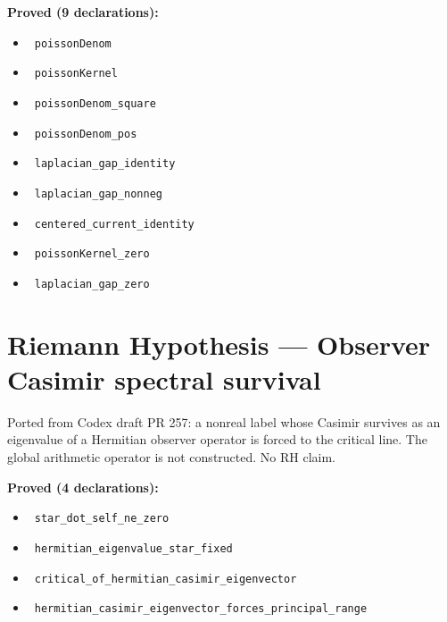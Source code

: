 \documentclass{report}
\theoremstyle{definition}
\begin{document}
\noindent\textbf{Proved (9 declarations):}
\begin{itemize}
  \item {}\leanok\ \texttt{poissonDenom}
  \item {}\leanok\ \texttt{poissonKernel}
  \item {}\leanok\ \texttt{poissonDenom\_square}
  \item {}\leanok\ \texttt{poissonDenom\_pos}
  \item {}\leanok\ \texttt{laplacian\_gap\_identity}
  \item {}\leanok\ \texttt{laplacian\_gap\_nonneg}
  \item {}\leanok\ \texttt{centered\_current\_identity}
  \item {}\leanok\ \texttt{poissonKernel\_zero}
  \item {}\leanok\ \texttt{laplacian\_gap\_zero}
\end{itemize}

\section{Riemann Hypothesis --- Observer Casimir spectral survival}
Ported from Codex draft PR 257: a nonreal label whose Casimir survives as an eigenvalue of a Hermitian observer operator is forced to the critical line. The global arithmetic operator is not constructed. No RH claim.

\noindent\textbf{Proved (4 declarations):}
\begin{itemize}
  \item {}\leanok\ \texttt{star\_dot\_self\_ne\_zero}
  \item {}\leanok\ \texttt{hermitian\_eigenvalue\_star\_fixed}
  \item {}\leanok\ \texttt{critical\_of\_hermitian\_casimir\_eigenvector}
  \item {}\leanok\ \texttt{hermitian\_casimir\_eigenvector\_forces\_principal\_range}
\end{itemize}
\end{document}
